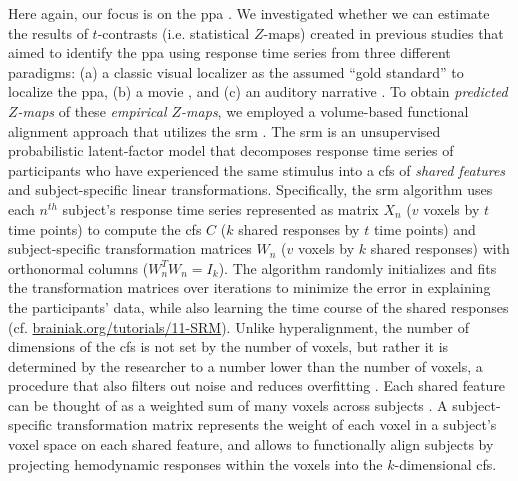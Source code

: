Here again, our focus is on the \ac{ppa} \citep[e.g.,][for
reviews]{epstein2014neural, aminoff2013role}.
%
We investigated whether we can estimate the results of $t$-contrasts (i.e.
statistical $Z$-maps) created in previous studies that aimed to identify the
\ac{ppa} using response time series from three different paradigms:
%
(a) a classic visual localizer \citep{sengupta2016extension} as the assumed
``gold standard'' to localize the \ac{ppa},
%
(b) a movie \citep{haeusler2022processing}, and
%
(c) an auditory narrative \citep{haeusler2022processing}.
%
To obtain \textit{predicted $Z$-maps} of these \textit{empirical $Z$-maps}, we
employed a volume-based functional alignment approach that utilizes the \ac{srm}
\citep{chen2015reduced, richard2019fast}.
The \ac{srm} is an unsupervised probabilistic latent-factor model that
decomposes response time series of participants who have experienced the same
stimulus into a \ac{cfs} of \textit{shared features} \citep[also known as
\textit{shared feature space};][]{chen2015reduced} and subject-specific linear
transformations.
Specifically, the \ac{srm} algorithm uses each $n^{th}$ subject's response time
series represented as matrix $X_{n}$ ({$v$} voxels by $t$ time points) to
compute the \ac{cfs} $C$ ($k$ shared responses by $t$ time points) and
subject-specific transformation matrices $W_{n}$ ($v$ voxels by $k$ shared
responses) with orthonormal columns ($W_{n}^{T}W_{n}=I_{k}$).
The algorithm randomly initializes and fits the transformation matrices over
iterations to minimize the error in explaining the participants' data, while
also learning the time course of the shared responses (cf.
\href{https://brainiak.org/tutorials/11-SRM/}{\url{brainiak.org/tutorials/11-SRM}}).
Unlike hyperalignment, the number of dimensions of the \ac{cfs} is not set by
the number of voxels, but rather it is determined by the researcher to a number
lower than the number of voxels, a procedure that also filters out noise and
reduces overfitting \citep{chen2015reduced}.
Each shared feature can be thought of as a weighted sum of many voxels across
subjects \citep{kumar2020brainiak}.
A subject-specific transformation matrix represents the weight of each voxel in
a subject's voxel space on each shared feature, and allows to functionally align
subjects by projecting hemodynamic responses within the voxels into the
$k$-dimensional \ac{cfs}.

